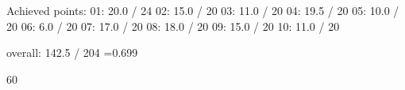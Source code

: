 Achieved points:
01: 20.0 / 24
02: 15.0 / 20
03: 11.0 / 20
04: 19.5 / 20
05: 10.0 / 20
06:  6.0 / 20
07: 17.0 / 20
08: 18.0 / 20
09: 15.0 / 20
10: 11.0 / 20

overall: 142.5 / 204 =0.699%


60%
